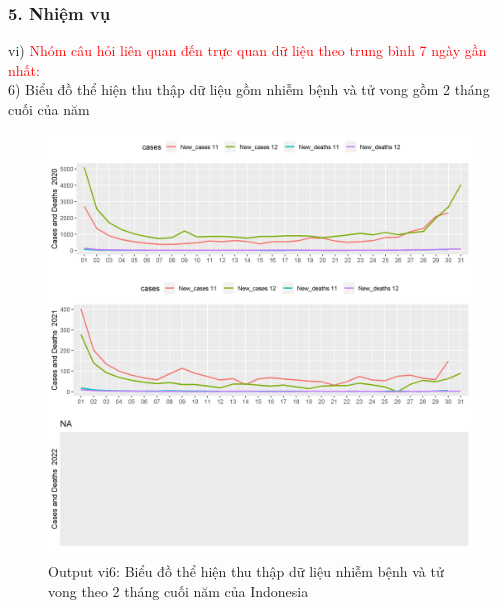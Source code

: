 \documentclass[english,10pt,table]{beamer}
\begin{document}
\begin{frame}[fragile]
\frametitle{5.  Nhiệm vụ}
vi) \textcolor{red}{Nhóm câu hỏi liên quan đến trực quan dữ liệu theo trung bình 7 ngày gần nhất:}\\
    6) Biểu đồ thể hiện thu thập dữ liệu gồm nhiễm bệnh và tử vong gồm 2 tháng cuối của năm
	\begin{figure}[h!]
	\begin{center}
		    \includegraphics[scale = 0.26]{Images/VI/vi6 Indonesia .jpeg}
		     \caption{Output vi6: Biểu đồ thể hiện thu thập dữ liệu nhiễm bệnh và tử vong theo 2 tháng cuối năm của Indonesia}
		\end{center}
		\end{figure}
\end{frame}
\end{document}
